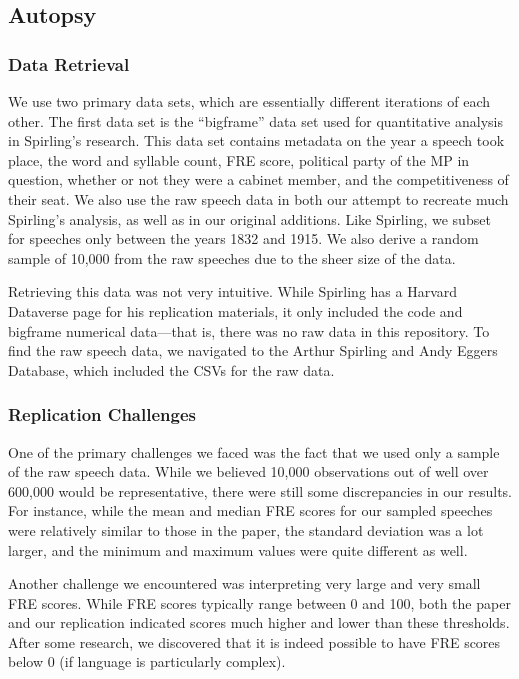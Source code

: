 \documentclass[
  letterpaper,
  DIV=11,
  numbers=noendperiod]{scrartcl}
\begin{document}
\subsection{Autopsy}\label{autopsy}

\subsubsection{Data Retrieval}\label{data-retrieval}

We use two primary data sets, which are essentially different iterations
of each other. The first data set is the ``bigframe'' data set used for
quantitative analysis in Spirling's research. This data set contains
metadata on the year a speech took place, the word and syllable count,
FRE score, political party of the MP in question, whether or not they
were a cabinet member, and the competitiveness of their seat. We also
use the raw speech data in both our attempt to recreate much Spirling's
analysis, as well as in our original additions. Like Spirling, we subset
for speeches only between the years 1832 and 1915. We also derive a
random sample of 10,000 from the raw speeches due to the sheer size of
the data.~

Retrieving this data was not very intuitive. While Spirling has a
Harvard Dataverse page for his replication materials, it only included
the code and bigframe numerical data---that is, there was no raw data in
this repository. To find the raw speech data, we navigated to the Arthur
Spirling and Andy Eggers Database, which included the CSVs for the raw
data.

\subsubsection{Replication Challenges}\label{replication-challenges}

One of the primary challenges we faced was the fact that we used only a
sample of the raw speech data. While we believed 10,000 observations out
of well over 600,000 would be representative, there were still some
discrepancies in our results. For instance, while the mean and median
FRE scores for our sampled speeches were relatively similar to those in
the paper, the standard deviation was a lot larger, and the minimum and
maximum values were quite different as well.

Another challenge we encountered was interpreting very large and very
small FRE scores. While FRE scores typically range between 0 and 100,
both the paper and our replication indicated scores much higher and
lower than these thresholds. After some research, we discovered that it
is indeed possible to have FRE scores below 0 (if language is
particularly complex).
\end{document}
